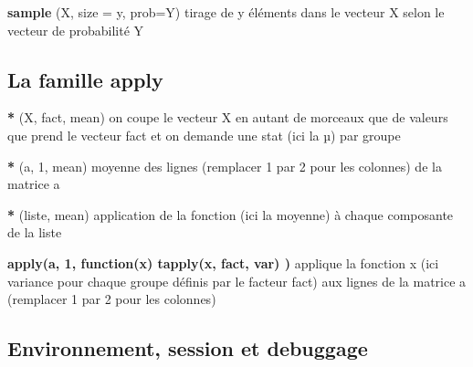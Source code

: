 \documentclass[11, a4paper, landscape]{article}
\newif\ifadvanced
\newcommand{\grasindex}[1]{\textbf{#1} \index{#1\textbf}}
\newcommand{\adv}[1]{\ifadvanced #1 \fi}
\begin{document}
\begin{multicols*}{3}
{  \grasindex{sample}(X, size = y, prob=Y)  \quad tirage de y éléments dans le vecteur X selon le vecteur de probabilité Y 
}

\adv{
  \subsection{Autres fonctions pour la programmation}

  \grasindex{parse}(``text'')  \quad transforme un texte en une expression qui n'est pas évaluée 

  \grasindex{deparse}(``text'')  \quad transforme une expression en texte 

  \grasindex{eval}(\textit{expr}, envir=data) \quad  évalue l'expression dans un environnement (ici l'environnement data, souvent un sous forme de dataframe) \textit{e.g.} \textbf{eval(parse}(``text''))  \quad évalue une expression ayant été transformé en texte
}

\subsection{La famille apply}
\adv{ \textit{cf} package \grasindex{dplyr} pour des fonctions plus performantes.
\\
}

\grasindex*{tapply}(X, fact, mean)  \quad on coupe le vecteur X en autant de morceaux que de valeurs que prend le vecteur fact et on demande une stat (ici la µ) par groupe

\grasindex*{apply}(a, 1, mean)  \quad moyenne des lignes (remplacer 1 par 2 pour les colonnes) de la matrice a

\grasindex*{lapply}(liste, mean)  \quad application de la fonction (ici la moyenne) à chaque composante de la liste \adv{df[] <- lapply(liste, mean) stocke les résultats dans le dataframe df}

\textbf{apply(a, 1, function(x) tapply(x, fact, var) )}  \quad applique la fonction x (ici variance pour chaque groupe définis par le facteur fact) aux lignes de la matrice a (remplacer 1 par 2 pour les colonnes) 

\adv{
  \grasindex{sapply} \quad identique à lapply mais retourne un vecteur ou une matrice plutôt qu'une liste. \textit{cf} aussi les fonctions \textbf{mapply} et \textbf{vapply}
}


\subsection{Environnement, session et debuggage}\label{EnvSesDeb}


\end{multicols*}
\end{document}
